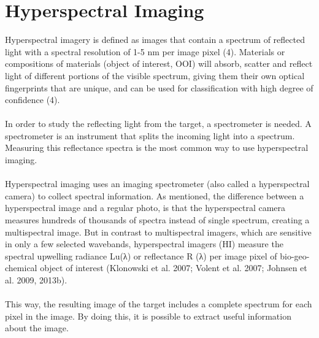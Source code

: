 \section{Hyperspectral Imaging}
Hyperspectral imagery is defined as images that contain a spectrum of reflected light with a spectral resolution of 1-5 nm per image pixel (4). Materials or compositions of materials (object of interest, OOI) will absorb, scatter and reflect light of different portions of the visible spectrum, giving them their own optical fingerprints that are unique, and can be used for classification with high degree of confidence (4). 
\\\\
In order to study the reflecting light from the target, a spectrometer is needed. A spectrometer is an instrument that splits the incoming light into a spectrum. Measuring this reflectance spectra is the most common way to use hyperspectral imaging.
\\\\
Hyperspectral imaging uses an imaging spectrometer (also called a hyperspectral camera) to collect spectral information. As mentioned, the difference between a hyperspectral image and a regular photo, is that the hyperspectral camera measures hundreds of thousands of spectra instead of single spectrum, creating a multispectral image. But in contrast to multispectral imagers, which are sensitive in only a few selected wavebands, hyperspectral imagers (HI) measure the spectral upwelling radiance Lu(λ) or reflectance R (λ) per image pixel of bio-geo-chemical object of interest (Klonowski et al. 2007; Volent et al. 2007; Johnsen et al. 2009, 2013b). %
\\\\
This way, the resulting image of the target includes a complete spectrum for each pixel in the image. By doing this, it is possible to extract useful information about the image.
\\\\


